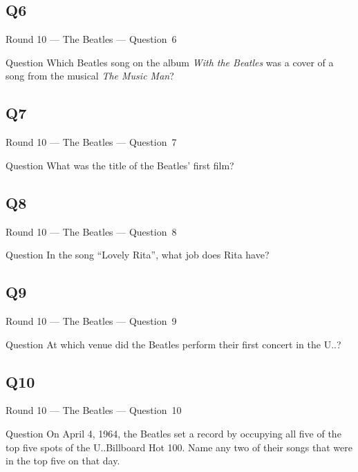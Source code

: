 \documentclass[11pt]{beamer}
\begin{document}
\subsection*{Q6}
\begin{frame}[t]{Round 10 --- The Beatles --- \mbox{Question 6}}
\vspace{-0.5em}
\begin{block}{Question}
Which Beatles song on the album \emph{With the Beatles} was a cover of a song from the musical \emph{The Music Man}?
\end{block}
\end{frame}
\subsection*{Q7}
\begin{frame}[t]{Round 10 --- The Beatles --- \mbox{Question 7}}
\vspace{-0.5em}
\begin{block}{Question}
What was the title of the Beatles' first film?
\end{block}
\end{frame}
\subsection*{Q8}
\begin{frame}[t]{Round 10 --- The Beatles --- \mbox{Question 8}}
\vspace{-0.5em}
\begin{block}{Question}
In the song ``Lovely Rita'', what job does Rita have?
\end{block}
\end{frame}
\subsection*{Q9}
\begin{frame}[t]{Round 10 --- The Beatles --- \mbox{Question 9}}
\vspace{-0.5em}
\begin{block}{Question}
At which venue did the Beatles perform their first concert in the U.\@S.\@?
\end{block}
\end{frame}
\subsection*{Q10}
\begin{frame}[t]{Round 10 --- The Beatles --- \mbox{Question 10}}
\vspace{-0.5em}
\begin{block}{Question}
On April 4, 1964, the Beatles set a record by occupying all five of the top five spots of the U.\@S.\@ Billboard Hot 100. Name any two of their songs that were in the top five on that day.
\end{block}
\end{frame}
\end{document}
